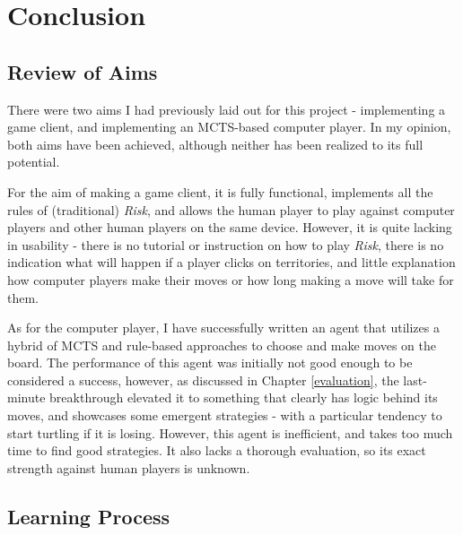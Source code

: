 \graphicspath{ {./Images/} }
\chapter{Conclusion}
\label{conclusion}
\section{Review of Aims}
\label{reviewOfAims}

There were two aims I had previously laid out for this project - implementing a game client, and implementing an MCTS-based computer player. In my opinion, both aims have been achieved, although neither has been realized to its full potential.

For the aim of making a game client, it is fully functional, implements all the rules of (traditional) \textit{Risk}, and allows the human player to play against computer players and other human players on the same device. However, it is quite lacking in usability - there is no tutorial or instruction on how to play \textit{Risk}, there is no indication what will happen if a player clicks on territories, and little explanation how computer players make their moves or how long making a move will take for them.

As for the computer player, I have successfully written an agent that utilizes a hybrid of MCTS and rule-based approaches to choose and make moves on the board. The performance of this agent was initially not good enough to be considered a success, however, as discussed in Chapter \ref{evaluation}, the last-minute breakthrough elevated it to something that clearly has logic behind its moves, and showcases some emergent strategies - with a particular tendency to start turtling if it is losing. However, this agent is inefficient, and takes too much time to find good strategies. It also lacks a thorough evaluation, so its exact strength against human players is unknown.

\section{Learning Process}
\label{learningProcess}

